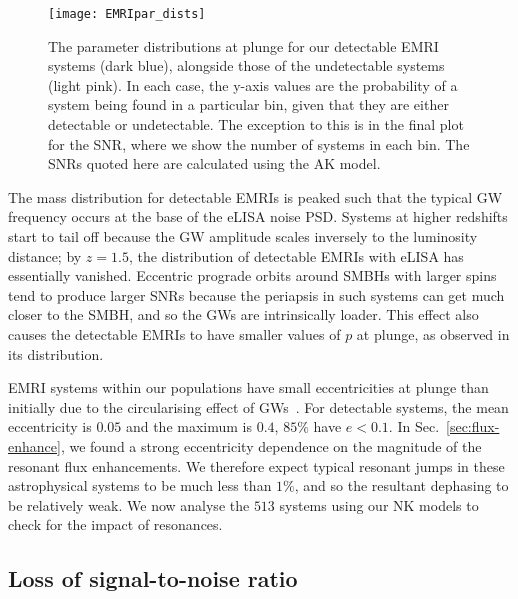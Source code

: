 \documentclass[aps,prd,amsfonts,amssymb,amsmath,nofootinbib,showpacs,superscriptaddress,twocolumn,floatfix]{revtex4-1}
\newcommand{\secref}[1]{Sec.~\ref{sec:#1}}
\begin{document}
\begin{figure}
\centering
\texttt{[image: EMRIpar\_dists]}
\caption{\label{fig:EMRIpar-dists}The parameter distributions at plunge for our detectable EMRI systems (dark blue), alongside those of the undetectable systems (light pink). In each case, the y-axis values are the probability of a system being found in a particular bin, given that they are either detectable or undetectable. The exception to this is in the final plot for the SNR, where we show the number of systems in each bin. The SNRs quoted here are calculated using the AK model.}
\end{figure}

The mass distribution for detectable EMRIs is peaked such that the typical GW frequency occurs at the base of the eLISA noise PSD. Systems at higher redshifts start to tail off because the GW amplitude scales inversely to the luminosity distance; by $z = 1.5$, the distribution of detectable EMRIs with eLISA has essentially vanished. Eccentric prograde orbits around SMBHs with larger spins tend to produce larger SNRs because the periapsis in such systems can get much closer to the SMBH, and so the GWs are intrinsically loader. This effect also causes the detectable EMRIs to have smaller values of $p$ at plunge, as observed in its distribution.

EMRI systems within our populations have small eccentricities at plunge than initially due to the circularising effect of GWs~\cite{Peters1964}. For detectable systems, the mean eccentricity is $0.05$ and the maximum is $0.4$, $85\%$ have $e < 0.1$. In \secref{flux-enhance}, we found a strong eccentricity dependence on the magnitude of the resonant flux enhancements. We therefore expect typical resonant jumps in these astrophysical systems to be much less than $1\%$, and so the resultant dephasing to be relatively weak. We now analyse the $513$ systems using our NK models to check for the impact of resonances.

\subsection{Loss of signal-to-noise ratio}
\label{sec:population-SNR}
\end{document}
